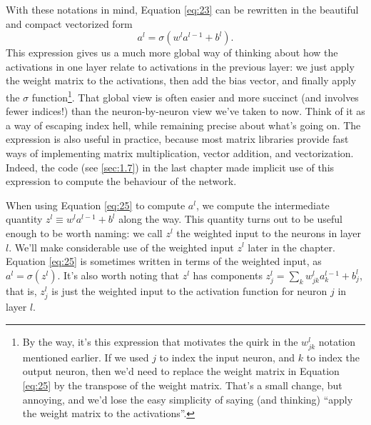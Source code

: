 \documentclass[a4paper,twoside,10pt]{book}
\begin{document}
With these notations in mind, Equation \ref{eq:23} can be rewritten in the beautiful and compact vectorized form
\begin{equation}
a^{l} = \sigma(w^l a^{l-1}+b^l).
\label{eq:25}
\end{equation}
This expression gives us a much more global way of thinking about how the activations in one layer relate to activations in the previous layer: we just apply the weight matrix to the activations, then add the bias vector, and finally apply the $\sigma$ function\footnote{By the way, it's this expression that motivates the quirk in the $w^l_{jk}$ notation mentioned earlier. If we used $j$ to index the input neuron, and $k$ to index the output neuron, then we'd need to replace the weight matrix in Equation \ref{eq:25} by the transpose of the weight matrix. That's a small change, but annoying, and we'd lose the easy simplicity of saying (and thinking) ``apply the weight matrix to the activations''.}. That global view is often easier and more succinct (and involves fewer indices!) than the neuron-by-neuron view we've taken to now. Think of it as a way of escaping index hell, while remaining precise about what's going on. The expression is also useful in practice, because most matrix libraries provide fast ways of implementing matrix multiplication, vector addition, and vectorization. Indeed, the code (see \ref{sec:1.7}) in the last chapter made implicit use of this expression to compute the behaviour of the network.

When using Equation \ref{eq:25} to compute $a^l$, we compute the intermediate quantity $z^l \equiv w^l a^{l-1}+b^l$ along the way. This quantity turns out to be useful enough to be worth naming: we call $z^l$ the weighted input to the neurons in layer $l$. We'll make considerable use of the weighted input $z^l$ later in the chapter. Equation \ref{eq:25} is sometimes written in terms of the weighted input, as $a^l=\sigma(z^l)$. It's also worth noting that $z^l$ has components $z^l_j= \sum_k w^l_{jk} a^{l-1}_k+b^l_j$, that is, $z^l_j$ is just the weighted input to the activation function for neuron $j$ in layer $l$.
\end{document}
